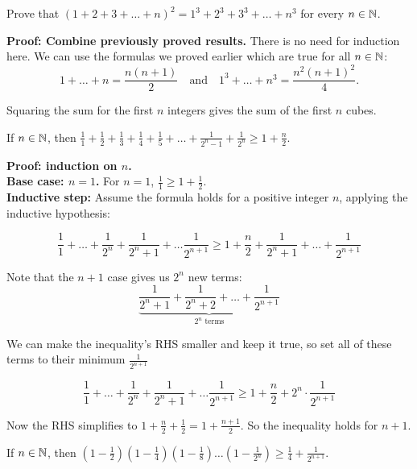 \documentclass{article}
\begin{document}
\begin{problem}
Prove that $(1 + 2 + 3 + \ldots + n)^2 = 1^3 + 2^3 + 3^3 + \ldots + n^3$ for every $n \in \mathbb{N}$.
\end{problem}

\textbf{Proof: Combine previously proved results.} There is no need for induction here. We can use the formulas we proved earlier which are true for all $n \in \mathbb{N}$:
\\

$$1 + \ldots + n = \frac{n(n+1)}{2} \quad \text{and} \quad 1^3 + \ldots + n^3 = \frac{n^2(n+1)^2}{4}.$$

Squaring the sum for the first $n$ integers gives the sum of the first $n$ cubes.

\begin{problem}
If $n \in \mathbb{N}$, then $\frac{1}{1} + \frac{1}{2} + \frac{1}{3} + \frac{1}{4} + \frac{1}{5} + \ldots + \frac{1}{2^n - 1} + \frac{1}{2^n} \geq 1 + \frac{n}{2}$.
\end{problem}

\textbf{Proof: induction on $n$.}
\\

\textbf{Base case: $n = 1$.} For $n = 1$, $\frac{1}{1} \geq 1 + \frac{1}{2}$.
\\

\textbf{Inductive step:} Assume the formula holds for a positive integer $n$, applying the inductive hypothesis:

$$\frac{1}{1} + \ldots + \frac{1}{2^n} + \frac{1}{2^n + 1} + \ldots \frac{1}{2^{n+1}} \geq 1 + \frac{n}{2} + \frac{1}{2^n + 1} + \ldots + \frac{1}{2^{n+1}}$$

Note that the $n+1$ case gives us $2^n$ new terms:
$$\underbrace{\frac{1}{2^n + 1} + \frac{1}{2^n + 2} + \ldots + \frac{1}{2^{n+1}}}_\text{$2^n$ terms}$$

We can make the inequality's RHS smaller and keep it true, so set all of these terms to their minimum $\frac{1}{2^{n+1}}$

$$\frac{1}{1} + \ldots + \frac{1}{2^n} + \frac{1}{2^n + 1} + \ldots \frac{1}{2^{n+1}} \geq 1 + \frac{n}{2} + 2^n \cdot \frac{1}{2^{n+1}}$$

Now the RHS simplifies to $1 + \frac{n}{2} + \frac{1}{2} = 1 + \frac{n+1}{2}$. So the inequality holds for $n+1$.

\begin{problem}
If $n \in \mathbb{N}$, then $\left(1 - \frac{1}{2}\right)\left(1 - \frac{1}{4}\right)\left(1 - \frac{1}{8}\right)\ldots\left(1 - \frac{1}{2^n}\right) \geq \frac{1}{4} + \frac{1}{2^{n+1}}$.
\end{problem}
\end{document}
